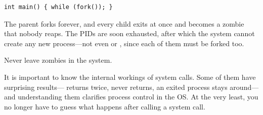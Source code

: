 \begin{example}
\begin{lstlisting}
int main() { while (fork()); }
\end{lstlisting}
  The parent forks forever, and every child exits at once and becomes a zombie that nobody reaps. The PIDs are soon exhausted, after which the system cannot create any new process---not even  or , since each of them must be forked too.
\end{example}

\begin{keypoint}
  Never leave zombies in the system.
\end{keypoint}

\begin{keypoint}[Summary]
  It is important to know the internal workings of system calls. Some of them have surprising results--- returns twice,  never returns, an exited process stays around---and understanding them clarifies process control in the OS. At the very least, you no longer have to guess what happens after calling a system call.
\end{keypoint}
